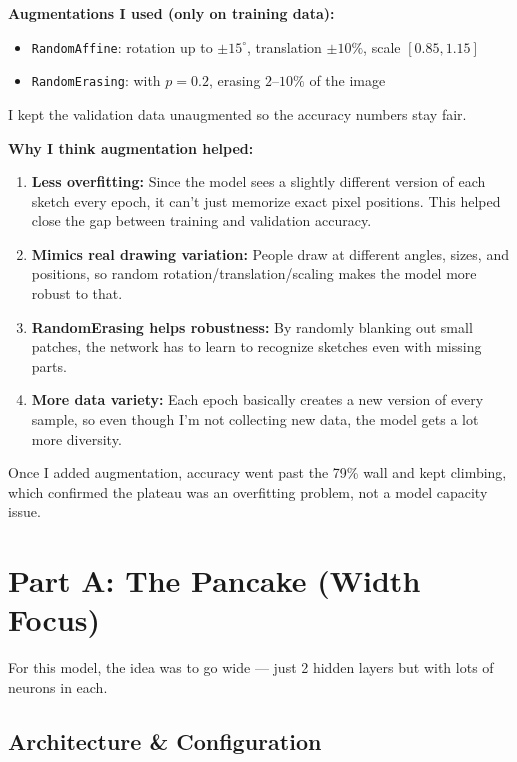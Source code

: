 \documentclass[12pt, a4paper]{article}
\begin{document}
\textbf{Augmentations I used (only on training data):}
\begin{itemize}
    \item \texttt{RandomAffine}: rotation up to $\pm15^{\circ}$, translation $\pm10\%$, scale $[0.85, 1.15]$
    \item \texttt{RandomErasing}: with $p=0.2$, erasing $2\text{--}10\%$ of the image
\end{itemize}

I kept the validation data unaugmented so the accuracy numbers stay fair.

\textbf{Why I think augmentation helped:}
\begin{enumerate}
    \item \textbf{Less overfitting:} Since the model sees a slightly different version of each sketch every epoch, it can't just memorize exact pixel positions. This helped close the gap between training and validation accuracy.
    \item \textbf{Mimics real drawing variation:} People draw at different angles, sizes, and positions, so random rotation/translation/scaling makes the model more robust to that.
    \item \textbf{RandomErasing helps robustness:} By randomly blanking out small patches, the network has to learn to recognize sketches even with missing parts.
    \item \textbf{More data variety:} Each epoch basically creates a new version of every sample, so even though I'm not collecting new data, the model gets a lot more diversity.
\end{enumerate}

Once I added augmentation, accuracy went past the 79\% wall and kept climbing, which confirmed the plateau was an overfitting problem, not a model capacity issue.

\newpage

\section{Part A: The Pancake (Width Focus)}

For this model, the idea was to go wide --- just 2 hidden layers but with lots of neurons in each.

\subsection{Architecture \& Configuration}
\end{document}
